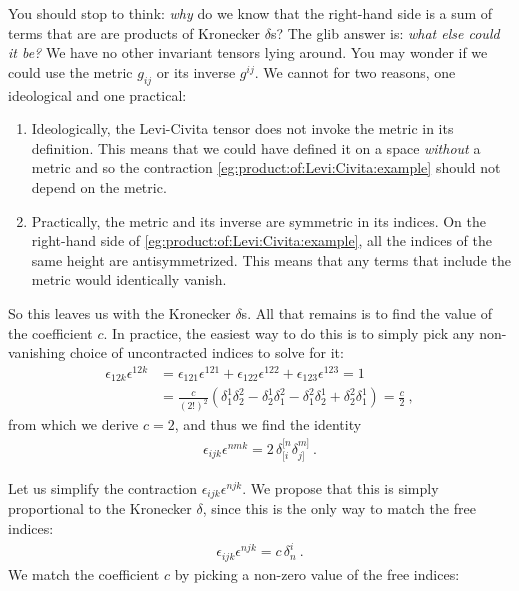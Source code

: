\begin{subappendices}
You should stop to think: \emph{why} do we know that the right-hand side is a sum of terms that are are products of Kronecker $\delta$s? The glib answer is: \emph{what else could it be?} We have no other invariant tensors lying around. You may wonder if we could use the metric $g_{ij}$ or its inverse $g^{ij}$. We cannot for two reasons, one ideological and one practical:
\begin{enumerate}
    \item Ideologically, the Levi-Civita tensor does not invoke the metric in its definition. This means that we could have defined it on a space \emph{without} a metric and so the contraction \eqref{eg:product:of:Levi:Civita:example} should not depend on the metric.
    \item Practically, the metric and its inverse are symmetric in its indices. On the right-hand side of \eqref{eg:product:of:Levi:Civita:example}, all the indices of the same height are antisymmetrized. This means that any terms that include the metric would identically vanish. 
\end{enumerate}
So this leaves us with the Kronecker $\delta$s. All that remains is to find the value of the coefficient $c$. In practice, the easiest way to do this is to simply pick any non-vanishing choice of uncontracted indices to solve for it:
\begin{align}
    \epsilon_{12k}\epsilon^{12k} &=
    \epsilon_{121}\epsilon^{121} 
    +
    \epsilon_{122}\epsilon^{122}
    +
    \epsilon_{123}\epsilon^{123}
    = 
    1 
    \\
    &= \frac{c}{(2!)^2}
    \left(
    \delta^1_1 \delta^2_2 
    - \delta^1_2 \delta^2_1
    -
    \delta^2_1 \delta^1_2 
    + \delta^2_2 \delta^1_1
    \right)
    =\frac{c}{2} \ ,
\end{align}
from which we derive $c=2$, and thus we find the identity
\begin{align}
\epsilon_{ijk}\epsilon^{nmk}
= 2 \, \delta^{[n}_{[i}\delta^{m]}_{j]}    \ .
\label{eg:product:of:Levi:Civita:example:answer} 
\end{align}
\begin{example}
Let us simplify the contraction $\epsilon_{ijk}\epsilon^{njk}$. We propose that this is simply proportional to the Kronecker $\delta$, since this is the only way to match the free indices:
\begin{align}
    \epsilon_{ijk}\epsilon^{njk} = c\, \delta^i_n \ . 
\end{align}
We match the coefficient $c$ by picking a non-zero value of the free indices:

\end{example}
\end{subappendices}
